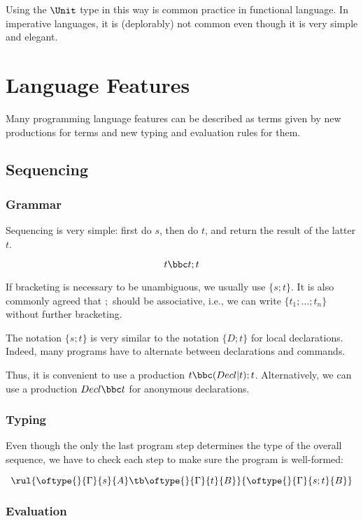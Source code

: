 Using the $\Unit$ type in this way is common practice in functional language.
In imperative languages, it is (deplorably) not common even though it is very simple and elegant.

\section{Language Features}

Many programming language features can be described as terms given by new productions for terms and new typing and evaluation rules for them.

\subsection{Sequencing}

\subsubsection{Grammar}

Sequencing is very simple: first do $s$, then do $t$, and return the result of the latter $t$.

\[t\bbc t;t\]

If bracketing is necessary to be unambiguous, we usually use $\{s;t\}$.
It is also commonly agreed that $;$ should be associative, i.e., we can write $\{t_1;\ldots;t_n\}$ without further bracketing.

The notation $\{s;t\}$ is very similar to the notation $\{D;t\}$ for local declarations.
Indeed, many programs have to alternate between declarations and commands.

Thus, it is convenient to use a production $t\bbc (Decl|t);t$.
Alternatively, we can use a production $Decl \bbc t$ for anonymous declarations.

\subsubsection{Typing}

Even though the only the last program step determines the type of the overall sequence, we have to check each step to make sure the program is well-formed:

\[\rul{\oftype{}{\Gamma}{s}{A}\tb \oftype{}{\Gamma}{t}{B}}
      {\oftype{}{\Gamma}{s;t}{B}}
\]

\subsubsection{Evaluation}

